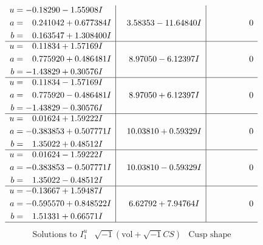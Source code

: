 \documentclass[1p]{elsarticle_modified}
\theoremstyle{definition}
\newcommand{\I}{\sqrt{-1}}
\begin{document}
$$\begin{array}{c|c|c}
\begin{aligned}
u &= -0.18290 - 1.55908 I \\
a &= \phantom{-}0.241042 + 0.677384 I \\
b &= \phantom{-}0.163547 + 1.308400 I\end{aligned}
 & \phantom{-}3.58353 - 11.64840 I & \phantom{-0.000000 } 0 \\ \hline\begin{aligned}
u &= \phantom{-}0.11834 + 1.57169 I \\
a &= \phantom{-}0.775920 + 0.486481 I \\
b &= -1.43829 + 0.30576 I\end{aligned}
 & \phantom{-}8.97050 - 6.12397 I & \phantom{-0.000000 } 0 \\ \hline\begin{aligned}
u &= \phantom{-}0.11834 - 1.57169 I \\
a &= \phantom{-}0.775920 - 0.486481 I \\
b &= -1.43829 - 0.30576 I\end{aligned}
 & \phantom{-}8.97050 + 6.12397 I & \phantom{-0.000000 } 0 \\ \hline\begin{aligned}
u &= \phantom{-}0.01624 + 1.59222 I \\
a &= -0.383853 + 0.507771 I \\
b &= \phantom{-}1.35022 + 0.48512 I\end{aligned}
 & \phantom{-}10.03810 + 0.59329 I & \phantom{-0.000000 } 0 \\ \hline\begin{aligned}
u &= \phantom{-}0.01624 - 1.59222 I \\
a &= -0.383853 - 0.507771 I \\
b &= \phantom{-}1.35022 - 0.48512 I\end{aligned}
 & \phantom{-}10.03810 - 0.59329 I & \phantom{-0.000000 } 0 \\ \hline\begin{aligned}
u &= -0.13667 + 1.59487 I \\
a &= -0.595570 + 0.848522 I \\
b &= \phantom{-}1.51331 + 0.66571 I\end{aligned}
 & \phantom{-}6.62792 + 7.94764 I & \phantom{-0.000000 } 0\\
 \hline 
 \end{array}$$\newpage$$\begin{array}{c|c|c}  
\text{Solutions to }I^u_{1}& \I (\text{vol} + \sqrt{-1}CS) & \text{Cusp shape}\\

\end{array}$$
\end{document}
